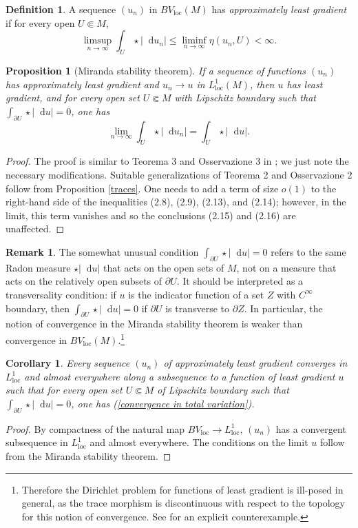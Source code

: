 \documentclass[reqno,10pt]{amsart}
\newcommand*\dif{\mathop{}\!\mathrm{d}}
\newcommand{\dfn}[1]{\emph{#1}\index{#1}}
\newcommand{\loc}{\mathrm{loc}}
\newtheorem{proposition}[theorem]{Proposition}
\newtheorem{corollary}[theorem]{Corollary}
\theoremstyle{definition}
\newtheorem{definition}[theorem]{Definition}
\newtheorem{remark}[theorem]{Remark}
\numberwithin{equation}{section}
\begin{document}
\begin{definition}
A sequence $(u_n)$ in $BV_\loc(M)$ has \dfn{approximately least gradient} if for every open $U \Subset M$,
$$\limsup_{n \to \infty} \int_U \star |\dif u_n| \leq \liminf_{n \to \infty} \eta(u_n, U) < \infty.$$
\end{definition}

\begin{proposition}[Miranda stability theorem]\label{Miranda convergence}
If a sequence of functions $(u_n)$ has approximately least gradient and $u_n \to u$ in $L^1_\loc(M)$, then $u$ has least gradient, and for every open set $U \Subset M$ with Lipschitz boundary such that $\int_{\partial U} \star |\dif u| = 0$, one has
\begin{equation}\label{convergence in total variation}
\lim_{n \to \infty} \int_U \star |\dif u_n| = \int_U \star |\dif u|.
\end{equation}
\end{proposition}
\begin{proof}
The proof is similar to Teorema 3 and Osservazione 3 in \cite{Miranda67}; we just note the necessary modifications.
Suitable generalizations of Teorema 2 and Osservazione 2 follow from Proposition \ref{traces}.
One needs to add a term of size $o(1)$ to the right-hand side of the inequalities (2.8), (2.9), (2.13), and (2.14); however, in the limit, this term vanishes and so the conclusions (2.15) and (2.16) are unaffected.
\end{proof}

\begin{remark}\label{transversality}
The somewhat unusual condition $\int_{\partial U} \star |\dif u| = 0$ refers to the same Radon measure $\star |\dif u|$ that acts on the open sets of $M$, not on a measure that acts on the relatively open subsets of $\partial U$.
It should be interpreted as a transversality condition: if $u$ is the indicator function of a set $Z$ with $C^\infty$ boundary, then $\int_{\partial U} \star |\dif u| = 0$ if $\partial U$ is transverse to $\partial Z$.
In particular, the notion of convergence in the Miranda stability theorem is weaker than convergence in $BV_\loc(M)$.\footnote{Therefore the Dirichlet problem for functions of least gradient is ill-posed in general, as the trace morphism is discontinuous with respect to the topology for this notion of convergence. See \cite{spradlin2013traces} for an explicit counterexample.}
\end{remark}

\begin{corollary}\label{compactness}
Every sequence $(u_n)$ of approximately least gradient converges in $L^1_\loc$ and almost everywhere along a subsequence to a function of least gradient $u$ such that for every open set $U \Subset M$ of Lipschitz boundary such that $\int_{\partial U} \star |\dif u| = 0$, one has (\ref{convergence in total variation}).
\end{corollary}
\begin{proof}
By compactness of the natural map $BV_\loc \to L^1_\loc$, $(u_n)$ has a convergent subsequence in $L^1_\loc$ and almost everywhere.
The conditions on the limit $u$ follow from the Miranda stability theorem.
\end{proof}
\end{document}
